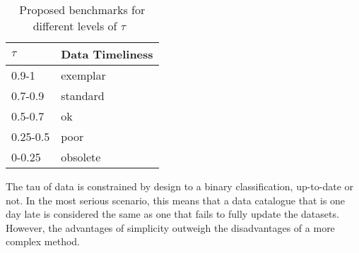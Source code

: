 \begin{table}[htbp]
    \centering

    \begin{tabular}{@{}ll@{}}
        \toprule
        \( \tau \)  & Data Timeliness   \\ \midrule
        0.9-1       & exemplar          \\
        0.7-0.9     & standard          \\
        0.5-0.7     & ok                \\
        0.25-0.5    & poor              \\
        0-0.25      & obsolete          \\
        \bottomrule
    \end{tabular}

    \caption{Proposed benchmarks for different levels of \( \tau \)~\cite{atz2014tau}}
    \label{table:timeliness-benchmarks}
\end{table}
\FloatBarrier

The tau of data is constrained by design to a binary classification, up-to-date or not.
In the most serious scenario, this means that a data catalogue that is one day late is considered the same as one that fails to fully update the datasets.
However, the advantages of simplicity outweigh the disadvantages of a more complex method.
